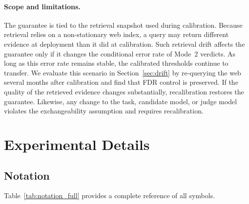 \paragraph{Scope and limitations.}
The guarantee is tied to the retrieval snapshot used during calibration. Because retrieval relies on a non-stationary web index, a query may return different evidence at deployment than it did at calibration. Such retrieval drift affects the guarantee only if it changes the conditional error rate of Mode~2 verdicts. As long as this error rate remains stable, the calibrated thresholds continue to transfer. We evaluate this scenario in Section~\ref{sec:drift} by re-querying the web several months after calibration and find that FDR control is preserved. If the quality of the retrieved evidence changes substantially, recalibration restores the guarantee. Likewise, any change to the task, candidate model, or judge model violates the exchangeability assumption and requires recalibration.

\section{Experimental Details}
\label{app:expdetails}

\subsection{Notation}
\label{app:notation}

Table~\ref{tab:notation_full} provides a complete reference of all symbols.

